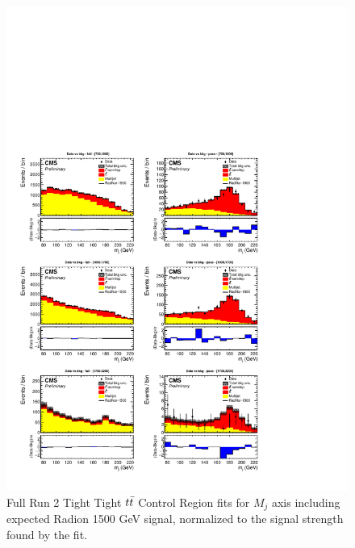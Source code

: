 \begin{figure}[!htb]
	\centering
	\includegraphics[width=1\textwidth]{Figures/postfit_projx_fits_TTtt.pdf}
	\caption{Full Run 2 Tight Tight $t\bar{t} $ Control Region fits for $M_j$ axis including expected Radion 1500 GeV signal, normalized to the signal strength found by the fit.}
	\label{fig:TTttmj}
\end{figure}
